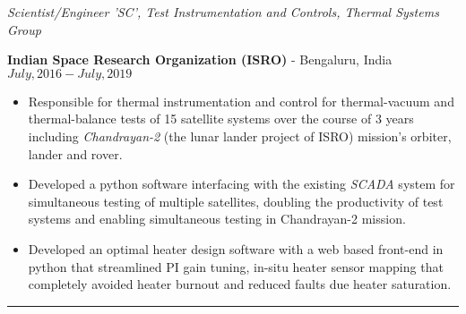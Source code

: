 \medskip

\noindent\textit{Scientist/Engineer 'SC', Test Instrumentation and Controls, Thermal Systems Group}

\textbf{Indian Space Research Organization (ISRO)} - Bengaluru, India \hfill $July, 2016 - July, 2019$

\begin{itemize}
        \item Responsible for thermal instrumentation and control for thermal-vacuum and thermal-balance tests of 15 satellite systems over the course of 3 years including \textit{Chandrayan-2} (the lunar lander project of ISRO) mission's orbiter, lander and rover.
        \item Developed a python software interfacing with the existing \textit{SCADA} system for simultaneous testing of multiple satellites, doubling the productivity of test systems and enabling simultaneous testing in Chandrayan-2 mission.
	\item Developed an optimal heater design software with a web based front-end in python that streamlined PI gain tuning, in-situ heater sensor mapping that completely avoided heater burnout and reduced faults due heater saturation.
\end{itemize}

\noindent\rule{\textwidth}{0.4pt}
